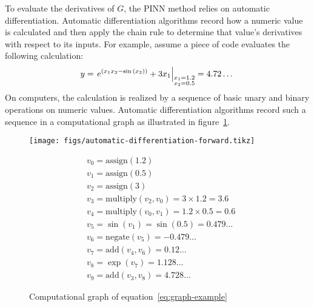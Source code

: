 To evaluate the derivatives of $G$, the PINN method relies on automatic differentiation.
Automatic differentiation algorithms record how a numeric value is calculated and then apply the chain rule to determine that value's derivatives with respect to its inputs.
For example, assume a piece of code evaluates the following calculation:
\begin{equation}\label{eq:graph-example}
 y = \left.{e^{\left(x_1x_2-\sin{\left(x_2\right)}\right)}+3x_1}\right|_{\begin{subarray}{l}x_1=1.2 \\ x_2=0.5\end{subarray}} = 4.72\dots
\end{equation}
On computers, the calculation is realized by a sequence of basic unary and binary operations on numeric values.
Automatic differentiation algorithms record such a sequence in a computational graph as illustrated in figure~\ref{fig:automatic-differentiation-forward}.

\begin{figure}[H]
    \Centering
    \begin{minipage}[c]{0.4\textwidth}
        \texttt{[image: figs/automatic-differentiation-forward.tikz]}
    \end{minipage}%
    \begin{minipage}[c]{0.5\textwidth}
        \scriptsize
        \singlespacing
        \begin{equation*}
            \begin{aligned}
                &v_0 = \mathrm{assign}\left(1.2\right) \\
                &v_1 = \mathrm{assign}\left(0.5\right) \\
                &v_2 = \mathrm{assign}\left(3\right) \\
                &v_3 = \mathrm{multiply}\left(v_2, v_0\right)  = 3 \times 1.2 = 3.6 \\
                &v_4 = \mathrm{multiply}\left(v_0, v_1\right) = 1.2 \times 0.5 = 0.6 \\
                &v_5 = \sin\left({v_1}\right) = \sin\left(0.5\right) = 0.479\dots \\
                &v_6 = \mathrm{negate}\left(v_5\right) = -0.479\dots \\
                &v_7 = \mathrm{add}\left(v_4, v_6\right) = 0.12\dots \\
                &v_8 = \exp\left({v_7}\right) = 1.128\dots \\
                &v_9 = \mathrm{add}\left(v_3, v_8\right) = 4.728\dots
            \end{aligned}
        \end{equation*}
    \end{minipage}
    \caption{Computational graph of equation~\ref{eq:graph-example}}%
    \label{fig:automatic-differentiation-forward}
\end{figure}

